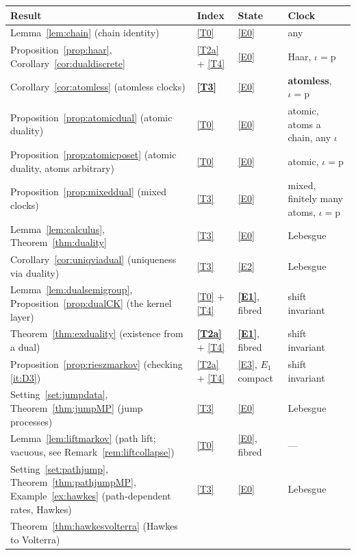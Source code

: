 \documentclass[11pt,a4paper]{article}
\theoremstyle{plain}
\theoremstyle{definition}
\theoremstyle{remark}
\begin{document}
\medskip
\noindent
\begin{tabular}{@{}p{}p{}p{}p{}@{}}
\toprule
\textbf{Result} & \textbf{Index} & \textbf{State} & \textbf{Clock} \\
\midrule
Lemma~\ref{lem:chain} (chain identity)
  & \eqref{T0} & \eqref{E0} & any \\
Proposition~\ref{prop:haar}, Corollary~\ref{cor:dualdiscrete}
  & \eqref{T2a} + \eqref{T4} & \eqref{E0} & Haar, $\iota = \mathrm{p}$ \\
Corollary~\ref{cor:atomless} (atomless clocks)
  & \textbf{\eqref{T3}} & \eqref{E0} & \textbf{atomless}, $\iota = \mathrm{p}$ \\
Proposition~\ref{prop:atomicdual} (atomic duality)
  & \eqref{T0} & \eqref{E0} & atomic, atoms a chain, any $\iota$ \\
Proposition~\ref{prop:atomicposet} (atomic duality, atoms arbitrary)
  & \eqref{T0} & \eqref{E0} & atomic, $\iota = \mathrm{p}$ \\
Proposition~\ref{prop:mixeddual} (mixed clocks)
  & \eqref{T3} & \eqref{E0} & mixed, finitely many atoms, $\iota = \mathrm{p}$ \\
Lemma~\ref{lem:calculus}, Theorem~\ref{thm:duality}
  & \eqref{T3} & \eqref{E0} & Lebesgue \\
Corollary~\ref{cor:uniqviadual} (uniqueness via duality)
  & \eqref{T3} & \eqref{E2} & Lebesgue \\
\midrule
Lemma~\ref{lem:dualsemigroup}, Proposition~\ref{prop:dualCK}
  (the kernel layer)
  & \eqref{T0} + \eqref{T4} & \textbf{\eqref{E1}}, fibred & shift invariant \\
Theorem~\ref{thm:exduality} (existence from a dual)
  & \textbf{\eqref{T2a}} + \eqref{T4} & \textbf{\eqref{E1}}, fibred & shift invariant \\
Proposition~\ref{prop:rieszmarkov} (checking \ref{it:D3})
  & \eqref{T2a} + \eqref{T4} & \eqref{E3}, $E_1$ compact & shift invariant \\
Setting~\ref{set:jumpdata}, Theorem~\ref{thm:jumpMP} (jump processes)
  & \eqref{T3} & \eqref{E0} & Lebesgue \\
Lemma~\ref{lem:liftmarkov} (path lift; vacuous, see
  Remark~\ref{rem:liftcollapse})
  & \eqref{T0} & \eqref{E0}, fibred & --- \\
Setting~\ref{set:pathjump}, Theorem~\ref{thm:pathjumpMP},
  Example~\ref{ex:hawkes} (path-dependent rates, Hawkes)
  & \eqref{T3} & \eqref{E0} & Lebesgue \\
Theorem~\ref{thm:hawkesvolterra} (Hawkes to Volterra)

\end{tabular}
\end{document}
